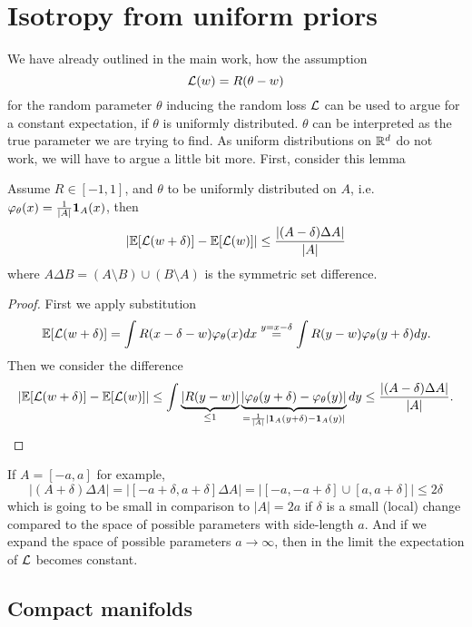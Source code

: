 \section{Isotropy from uniform priors}\label{sec: isotropy from uniform priors}

We have already outlined in the main work, how the assumption
\[
	\mathcal{L}(w) = R(\theta - w)
\]
for the random parameter \(\theta\) inducing the random loss \(\mathcal{L}\) can be
used to argue for a constant expectation, if \(\theta\) is uniformly distributed.
\(\theta\) can be interpreted as the true parameter we are trying to find.
As uniform distributions on \(\mathbb{R}^d\) do not work, we will have to argue
a little bit more. First, consider this lemma

\begin{lemma}
	Assume \(R \in [-1,1]\), and \(\theta\) to be uniformly distributed on
	\(A\), i.e. \(\varphi_\theta(x) = \frac{1}{|A|}\mathbf{1}_A(x)\), then
	\[
		|\mathbb{E}[\mathcal{L}(w + \delta)] - \mathbb{E}[\mathcal{L}(w)]|
		\le \frac{|(A-\delta) \Delta A|}{|A|}
	\]
	where \(A \Delta B = (A\setminus B) \cup (B\setminus A)\) is the symmetric
	set difference.
\end{lemma}

\begin{proof}
	First we apply substitution
	\[
		\mathbb{E}[\mathcal{L}(w + \delta)]
		= \int R(x -\delta - w) \varphi_\theta(x) dx
		\overset{y=x-\delta}= \int R(y - w) \varphi_\theta(y + \delta) dy.
	\]
	Then we consider the difference
	\[
		|\mathbb{E}[\mathcal{L}(w+ \delta)] - \mathbb{E}[\mathcal{L}(w)]|
		\le \int \underbrace{|R(y - w)|}_{\le 1}
		\underbrace{|\varphi_\theta(y + \delta) -\varphi_\theta(y)|}_{=\frac1{|A|}|\mathbf{1}_A(y+\delta) - \mathbf{1}_A(y)|} dy
		\le \frac{|(A-\delta)\Delta A|}{|A|}.
		\qedhere
	\]
\end{proof}

If \(A=[-a, a]\) for example,
\[
	|(A+\delta)\Delta A| = | [-a+\delta, a+\delta] \Delta A| = |[-a, -a+\delta] \cup [a, a+\delta]| \le 2\delta
\]
which is going to be small in comparison to \(|A|=2a\) if \(\delta\) is
a small (local) change compared to the space of possible parameters with
side-length \(a\). And if we expand the space of possible parameters
\(a\to\infty\), then in the limit the expectation of \(\mathcal{L}\) becomes constant.

\subsection{Compact manifolds}

